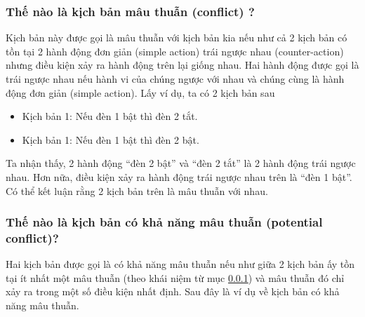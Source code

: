 \documentclass[12pt,a4paper,oneside]{extbook}
\begin{document}
\subsubsection{Thế nào là kịch bản mâu thuẫn (conflict) ?}\label{scenario-conflict}

Kịch bản này được gọi là mâu thuẫn với kịch bản kia nếu như cả 2 kịch bản có tồn tại 2 hành động đơn giản (simple action) trái ngược nhau (counter-action) nhưng điều kiện xảy ra hành động trên lại giống nhau. Hai hành động được gọi là trái ngược nhau nếu hành vi của chúng ngược với nhau và chúng cùng là hành động đơn giản (simple action). Lấy ví dụ, ta có 2 kịch bản sau

	\begin{itemize}[topsep=1mm,itemsep=-0.5mm]
	\item Kịch bản 1: Nếu đèn 1 bật thì đèn 2 tắt.
	\item Kịch bản 1: Nếu đèn 1 bật thì đèn 2 bật.
	\vspace{1mm}
	\end{itemize}
	
Ta nhận thấy, 2 hành động “đèn 2 bật” và “đèn 2 tắt” là 2 hành động trái ngược nhau. Hơn nữa, điều kiện xảy ra hành động trái ngược nhau trên là “đèn 1 bật”. Có thể kết luận rằng 2 kịch bản trên là mâu thuẫn với nhau.

\subsubsection{Thế nào là kịch bản có khả năng mâu thuẫn (potential conflict)?}

Hai kịch bản được gọi là có khả năng mâu thuẫn nếu như giữa 2 kịch bản ấy tồn tại ít nhất một mâu thuẫn (theo khái niệm từ mục \ref{scenario-conflict}) và mâu thuẫn đó chỉ xảy ra trong một số điều kiện nhất định. Sau đây là ví dụ về kịch bản có khả năng mâu thuẫn.
\end{document}
